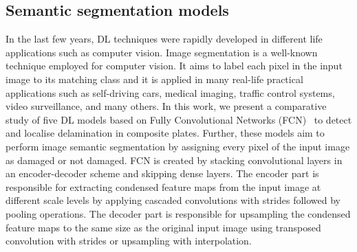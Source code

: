 \subsection{Semantic segmentation models}
\label{section:semantic_segmentation}
In the last few years, DL techniques were rapidly developed in different life applications such as computer vision.  
Image segmentation is a well-known technique employed for computer vision. 
It aims to label each pixel in the input image to its matching class and it is applied in many real-life practical applications such as self-driving cars, medical imaging, traffic control systems, video surveillance, and many others.
In this work, we present a comparative study of five DL models based on Fully Convolutional Networks (FCN)~\cite{Long} to detect and localise delamination in composite plates.
Further, these models aim to perform image semantic segmentation by assigning every pixel of the input image as damaged or not damaged. 
FCN is created by stacking convolutional layers in an encoder-decoder scheme and skipping dense layers. 
The encoder part is responsible for extracting condensed feature maps from the input image at different scale levels by applying cascaded convolutions with strides followed by pooling operations.
The decoder part is responsible for upsampling the condensed feature maps to the same size as the original input image using transposed convolution with strides or upsampling with interpolation.

